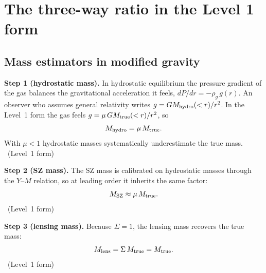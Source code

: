 \section{The three-way ratio in the Level 1 form}\label{sec:tw_ratio}
\subsection{Mass estimators in modified gravity}
\textbf{Step 1 (hydrostatic mass).} In hydrostatic equilibrium the pressure gradient of the gas balances the gravitational acceleration it feels,
$dP/dr=-\rho_g\,g(r)$. An observer who assumes general relativity writes $g=GM_{\rm hydro}(<r)/r^2$. In the Level~1 form the gas feels
$g=\mu\,GM_{\rm true}(<r)/r^2$, so
\begin{equation}
M_{\rm hydro}=\mu\,M_{\rm true}.
\label{eq:tw_mhydro}\end{equation}
With $\mu<1$ hydrostatic masses systematically underestimate the true mass. \derived\ (Level~1 form)

\textbf{Step 2 (SZ mass).} The SZ mass is calibrated on hydrostatic masses through the $Y$--$M$ relation, so at leading order it inherits the same factor:
\begin{equation}
M_{\rm SZ}\approx\mu\,M_{\rm true}.
\label{eq:tw_msz}\end{equation}
\derived\ (Level~1 form)

\textbf{Step 3 (lensing mass).} Because $\Sigma=1$, the lensing mass recovers the true mass:
\begin{equation}
M_{\rm lens}=\Sigma\,M_{\rm true}=M_{\rm true}.
\label{eq:tw_mlens}\end{equation}
\derived\ (Level~1 form)

